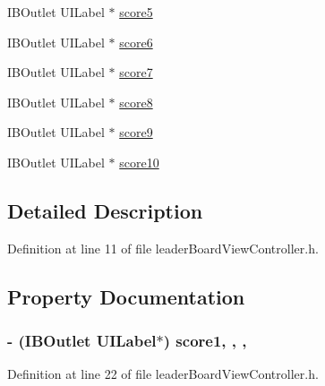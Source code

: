 \begin{DoxyCompactItemize}
\item 
I\+B\+Outlet U\+I\+Label $\ast$ \hyperlink{interfaceleader_board_view_controller_a305bd3706c2736b879572054cb0dd291}{score5}
\item 
I\+B\+Outlet U\+I\+Label $\ast$ \hyperlink{interfaceleader_board_view_controller_af07ad16a61eae84adbb9a8b94598132e}{score6}
\item 
I\+B\+Outlet U\+I\+Label $\ast$ \hyperlink{interfaceleader_board_view_controller_a323e3aae553ed02db70d1e70657cae02}{score7}
\item 
I\+B\+Outlet U\+I\+Label $\ast$ \hyperlink{interfaceleader_board_view_controller_a30c7019b7332fdda5641767592fd061b}{score8}
\item 
I\+B\+Outlet U\+I\+Label $\ast$ \hyperlink{interfaceleader_board_view_controller_a954485e5448eb0bd03c83228f96162d8}{score9}
\item 
I\+B\+Outlet U\+I\+Label $\ast$ \hyperlink{interfaceleader_board_view_controller_a92a493a4bb4f0e411a8a7efce1db8b11}{score10}
\end{DoxyCompactItemize}


\subsection{Detailed Description}


Definition at line 11 of file leader\+Board\+View\+Controller.\+h.



\subsection{Property Documentation}
\hypertarget{interfaceleader_board_view_controller_ae502354b7354aa7a23efe50fbc166c72}{}
\subsubsection[{score1}]{\setlength{\rightskip}{0pt plus 5cm}-\/ (I\+B\+Outlet U\+I\+Label$\ast$) score1\hspace{0.3cm}{\ttfamily [read]}, {\ttfamily [write]}, {\ttfamily [nonatomic]}, {\ttfamily [weak]}}\label{interfaceleader_board_view_controller_ae502354b7354aa7a23efe50fbc166c72}


Definition at line 22 of file leader\+Board\+View\+Controller.\+h.

